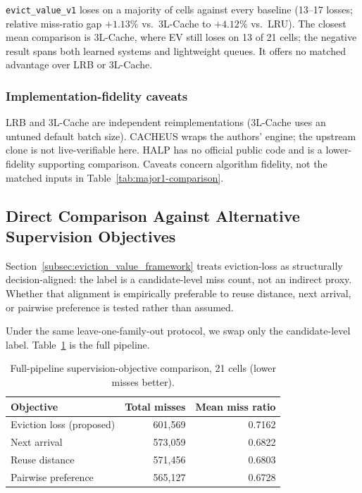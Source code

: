\documentclass[preprint,12pt]{elsarticle}
\begin{document}
\texttt{evict\_value\_v1} loses on a majority of cells against every baseline (13--17 losses; relative miss-ratio gap $+1.13\%$ vs.\ 3L-Cache to $+4.12\%$ vs.\ LRU). The closest mean comparison is 3L-Cache, where EV still loses on 13 of 21 cells; the negative result spans both learned systems and lightweight queues. It offers no matched advantage over LRB or 3L-Cache.

\subsubsection{Implementation-fidelity caveats}

LRB and 3L-Cache are independent reimplementations (3L-Cache uses an untuned default batch size). CACHEUS wraps the authors' engine; the upstream clone is not live-verifiable here. HALP has no official public code and is a lower-fidelity supporting comparison. Caveats concern algorithm fidelity, not the matched inputs in Table~\ref{tab:major1-comparison}.

\subsection{Direct Comparison Against Alternative Supervision Objectives}
\label{subsec:objective_comparison}

Section~\ref{subsec:eviction_value_framework} treats eviction-loss as structurally decision-aligned: the label is a candidate-level miss count, not an indirect proxy. Whether that alignment is empirically preferable to reuse distance, next arrival, or pairwise preference is tested rather than assumed.

Under the same leave-one-family-out protocol, we swap only the candidate-level label. Table~\ref{tab:objective-comparison} is the full pipeline.

\begin{table}[!htbp]
\centering
\caption{Full-pipeline supervision-objective comparison, 21 cells (lower misses better).}
\label{tab:objective-comparison}
\small
\renewcommand{\arraystretch}{1.15}
\begin{tabular}{l r r}
\toprule
Objective & Total misses & Mean miss ratio \\
\midrule
Eviction loss (proposed)  & 601{,}569 & 0.7162 \\
Next arrival              & 573{,}059 & 0.6822 \\
Reuse distance             & 571{,}456 & 0.6803 \\
Pairwise preference        & 565{,}127 & 0.6728 \\
\bottomrule
\end{tabular}
\end{table}
\end{document}
